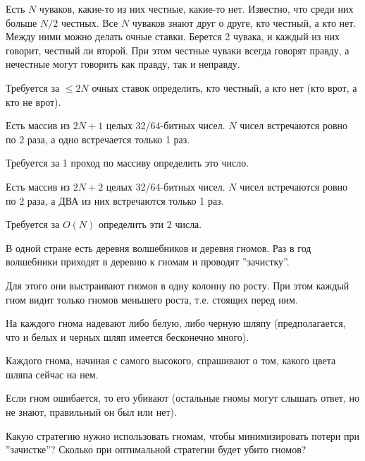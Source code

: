 \begin{problem}
Есть $N$ чуваков, какие-то из них честные, какие-то нет. Известно, что среди них больше $N/2$ честных. Все $N$ чуваков знают друг о друге, кто честный, а кто нет.
Между ними можно делать очные ставки. Берется 2 чувака, и каждый из них говорит, честный ли второй. При этом честные чуваки всегда говорят правду, а нечестные могут говорить как правду, так и неправду.

Требуется за $\leq 2N$ очных ставок определить, кто честный, а кто нет (кто врот, а кто не врот).

\end{problem}
\begin{problem}

Есть массив из $2N+1$ целых 32/64-битных чисел. $N$ чисел встречаются ровно по 2
раза, а одно встречается только 1 раз.

Требуется за 1 проход по массиву определить это число.

\end{problem}
\begin{problem}

Есть массив из $2N+2$ целых 32/64-битных чисел. $N$ чисел встречаются ровно по 2
раза, а ДВА из них встречаются только 1 раз.

Требуется за $O(N)$ определить эти 2 числа.

\end{problem}
\begin{problem}

В одной стране есть деревня волшебников и деревня гномов.
Раз в год волшебники приходят в деревню к гномам и проводят ''зачистку''.

Для этого они выстраивают гномов в одну колонну по росту. При этом каждый гном видит только гномов меньшего роста, т.е. стоящих перед ним. 

На каждого гнома надевают либо белую, либо черную шляпу (предполагается, что и белых и черных шляп имеется бесконечно много).

Каждого гнома, начиная с самого высокого, спрашивают о том, какого цвета шляпа сейчас на нем.

Если гном ошибается, то его убивают (остальные гномы могут слышать ответ, но не знают, правильный он был или нет).

Какую стратегию нужно использовать гномам, чтобы минимизировать потери при ''зачистке''?
Сколько при оптимальной стратегии будет убито гномов?

\end{problem}
